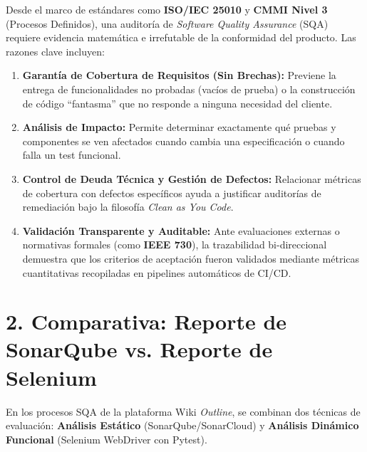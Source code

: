 \documentclass[12pt,a4paper]{article}
\begin{document}
\vspace{0.3cm}

\begin{tcolorbox}[colback=lightbg,colframe=secondary,boxrule=1pt,arc=2mm,title=\textbf{¿Por qué una Auditoría de Calidad exige esta Trazabilidad?}]
Desde el marco de estándares como \textbf{ISO/IEC 25010} y \textbf{CMMI Nivel 3} (Procesos Definidos), una auditoría de \textit{Software Quality Assurance} (SQA) requiere evidencia matemática e irrefutable de la conformidad del producto. Las razones clave incluyen:
\begin{enumerate}[leftmargin=*]
    \item \textbf{Garantía de Cobertura de Requisitos (Sin Brechas):} Previene la entrega de funcionalidades no probadas (vacíos de prueba) o la construcción de código ``fantasma'' que no responde a ninguna necesidad del cliente.
    \item \textbf{Análisis de Impacto:} Permite determinar exactamente qué pruebas y componentes se ven afectados cuando cambia una especificación o cuando falla un test funcional.
    \item \textbf{Control de Deuda Técnica y Gestión de Defectos:} Relacionar métricas de cobertura con defectos específicos ayuda a justificar auditorías de remediación bajo la filosofía \textit{Clean as You Code}.
    \item \textbf{Validación Transparente y Auditable:} Ante evaluaciones externas o normativas formales (como \textbf{IEEE 730}), la trazabilidad bi-direccional demuestra que los criterios de aceptación fueron validados mediante métricas cuantitativas recopiladas en pipelines automáticos de CI/CD.
\end{enumerate}
\end{tcolorbox}

\vspace{0.3cm}

\section*{\color{primary} 2. Comparativa: Reporte de SonarQube vs. Reporte de Selenium}

En los procesos SQA de la plataforma Wiki \textit{Outline}, se combinan dos técnicas de evaluación: \textbf{Análisis Estático} (SonarQube/SonarCloud) y \textbf{Análisis Dinámico Funcional} (Selenium WebDriver con Pytest).

\vspace{0.3cm}
\end{document}
